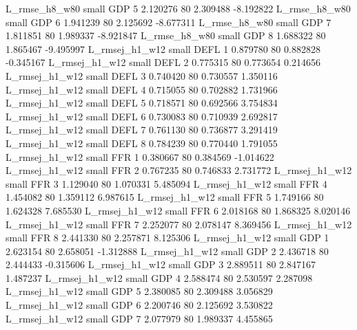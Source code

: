  L_rmse_h8_w80      small      GDP                 5 2.120276 80       2.309488          -8.192822
 L_rmse_h8_w80      small      GDP                 6 1.941239 80       2.125692          -8.677311
 L_rmse_h8_w80      small      GDP                 7 1.811851 80       1.989337          -8.921847
 L_rmse_h8_w80      small      GDP                 8 1.688322 80       1.865467          -9.495997
L_rmsej_h1_w12      small     DEFL                 1 0.879780 80       0.882828          -0.345167
L_rmsej_h1_w12      small     DEFL                 2 0.775315 80       0.773654           0.214656
L_rmsej_h1_w12      small     DEFL                 3 0.740420 80       0.730557           1.350116
L_rmsej_h1_w12      small     DEFL                 4 0.715055 80       0.702882           1.731966
L_rmsej_h1_w12      small     DEFL                 5 0.718571 80       0.692566           3.754834
L_rmsej_h1_w12      small     DEFL                 6 0.730083 80       0.710939           2.692817
L_rmsej_h1_w12      small     DEFL                 7 0.761130 80       0.736877           3.291419
L_rmsej_h1_w12      small     DEFL                 8 0.784239 80       0.770440           1.791055
L_rmsej_h1_w12      small      FFR                 1 0.380667 80       0.384569          -1.014622
L_rmsej_h1_w12      small      FFR                 2 0.767235 80       0.746833           2.731772
L_rmsej_h1_w12      small      FFR                 3 1.129040 80       1.070331           5.485094
L_rmsej_h1_w12      small      FFR                 4 1.454082 80       1.359112           6.987615
L_rmsej_h1_w12      small      FFR                 5 1.749166 80       1.624328           7.685530
L_rmsej_h1_w12      small      FFR                 6 2.018168 80       1.868325           8.020146
L_rmsej_h1_w12      small      FFR                 7 2.252077 80       2.078147           8.369456
L_rmsej_h1_w12      small      FFR                 8 2.441330 80       2.257871           8.125306
L_rmsej_h1_w12      small      GDP                 1 2.623154 80       2.658051          -1.312888
L_rmsej_h1_w12      small      GDP                 2 2.436718 80       2.444433          -0.315606
L_rmsej_h1_w12      small      GDP                 3 2.889511 80       2.847167           1.487237
L_rmsej_h1_w12      small      GDP                 4 2.588474 80       2.530597           2.287098
L_rmsej_h1_w12      small      GDP                 5 2.380085 80       2.309488           3.056829
L_rmsej_h1_w12      small      GDP                 6 2.200746 80       2.125692           3.530822
L_rmsej_h1_w12      small      GDP                 7 2.077979 80       1.989337           4.455865
